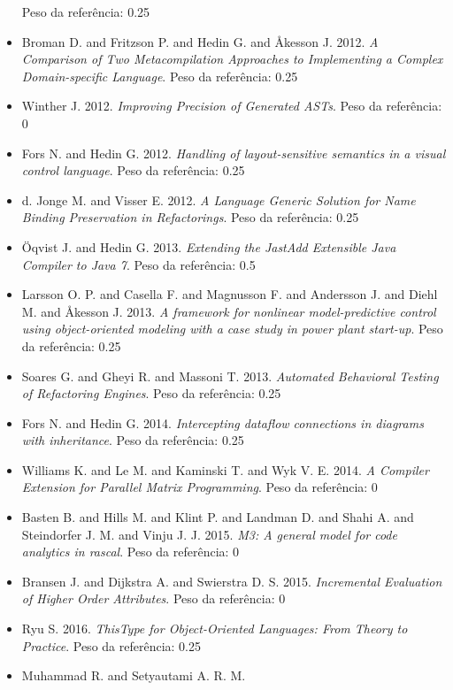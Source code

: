 \begin{itemize}
      Peso da referência: 0.25
\item Broman D. and Fritzson P. and Hedin G. and Åkesson J.
      2012.
      {\it A Comparison of Two Metacompilation Approaches to Implementing a Complex Domain-specific Language}.
      Peso da referência: 0.25
\item Winther J.
      2012.
      {\it Improving Precision of Generated ASTs}.
      Peso da referência: 0
\item Fors N. and Hedin G.
      2012.
      {\it Handling of layout-sensitive semantics in a visual control language}.
      Peso da referência: 0.25
\item d. Jonge M. and Visser E.
      2012.
      {\it A Language Generic Solution for Name Binding Preservation in Refactorings}.
      Peso da referência: 0.25
\item \"{O}qvist J. and Hedin G.
      2013.
      {\it Extending the JastAdd Extensible Java Compiler to Java 7}.
      Peso da referência: 0.5
\item Larsson O. P. and Casella F. and Magnusson F. and Andersson J. and Diehl M. and Åkesson J.
      2013.
      {\it A framework for nonlinear model-predictive control using object-oriented modeling with a case study in power plant start-up}.
      Peso da referência: 0.25
\item Soares G. and Gheyi R. and Massoni T.
      2013.
      {\it Automated Behavioral Testing of Refactoring Engines}.
      Peso da referência: 0.25
\item Fors N. and Hedin G.
      2014.
      {\it Intercepting dataflow connections in diagrams with inheritance}.
      Peso da referência: 0.25
\item Williams K. and Le M. and Kaminski T. and Wyk V. E.
      2014.
      {\it A Compiler Extension for Parallel Matrix Programming}.
      Peso da referência: 0
\item Basten B. and Hills M. and Klint P. and Landman D. and Shahi A. and Steindorfer J. M. and Vinju J. J.
      2015.
      {\it M3: A general model for code analytics in rascal}.
      Peso da referência: 0
\item Bransen J. and Dijkstra A. and Swierstra D. S.
      2015.
      {\it Incremental Evaluation of Higher Order Attributes}.
      Peso da referência: 0
\item Ryu S.
      2016.
      {\it ThisType for Object-Oriented Languages: From Theory to Practice}.
      Peso da referência: 0.25
\item Muhammad R. and Setyautami A. R. M.

\end{itemize}
